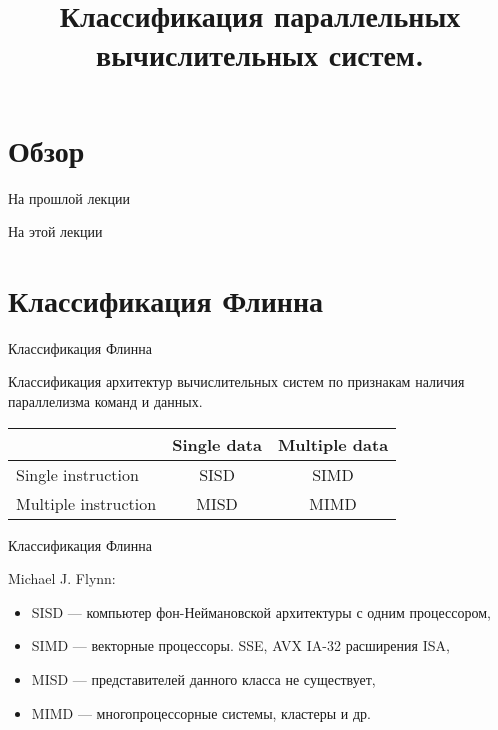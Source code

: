 

\title{Классификация параллельных вычислительных систем.}



\begin{frame}
\titlepage
\end{frame}

\section*{Обзор}

\begin{frame}{На прошлой лекции}
\end{frame}

\begin{frame}{На этой лекции}
\tableofcontents
\end{frame}

\section{Классификация Флинна}

\begin{frame}{Классификация Флинна}

Классификация архитектур вычислительных систем по признакам наличия параллелизма
команд и данных.

\begin{table}[htp]
    \begin{center}
    \begin{tabular}{|l|c|c|}
        \hline
                                & Single data   & Multiple data \\
        \hline
        Single instruction      & SISD          & SIMD \\
        \hline
        Multiple instruction    & MISD          & MIMD \\
        \hline
    \end{tabular}
    \end{center}
\end{table}

\end{frame}

\begin{frame}{Классификация Флинна}

Michael J. Flynn:

\begin{itemize}
    \item SISD --- компьютер фон-Неймановской архитектуры с одним процессором,
    \item SIMD --- векторные процессоры. SSE, AVX IA-32 расширения ISA,
    \item MISD --- представителей данного класса не существует,
    \item MIMD --- многопроцессорные системы, кластеры и др.
\end{itemize}
\end{frame}

